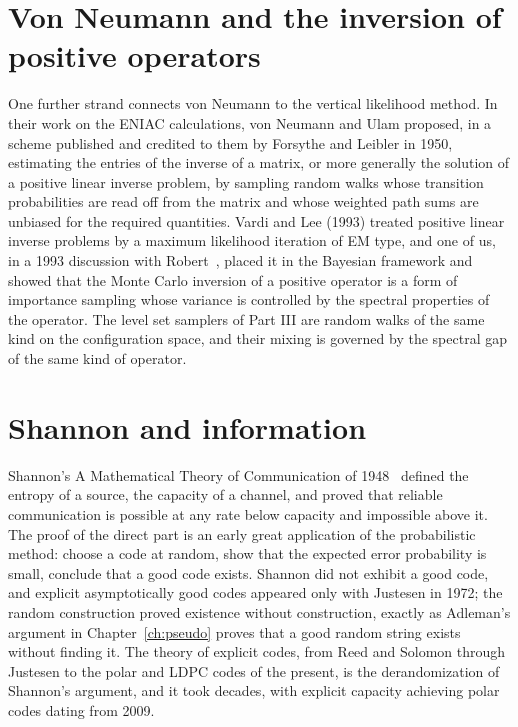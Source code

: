 \section{Von Neumann and the inversion of positive operators}

One further strand connects von Neumann to the vertical likelihood method. In their work on the ENIAC calculations, von Neumann and Ulam proposed, in a scheme published and credited to them by Forsythe and Leibler in 1950, estimating the entries of the inverse of a matrix, or more generally the solution of a positive linear inverse problem, by sampling random walks whose transition probabilities are read off from the matrix and whose weighted path sums are unbiased for the required quantities. Vardi and Lee (1993) treated positive linear inverse problems by a maximum likelihood iteration of EM type, and one of us, in a 1993 discussion with Robert~\cite{PolsonRobert}, placed it in the Bayesian framework and showed that the Monte Carlo inversion of a positive operator is a form of importance sampling whose variance is controlled by the spectral properties of the operator. The level set samplers of Part III are random walks of the same kind on the configuration space, and their mixing is governed by the spectral gap of the same kind of operator.

\section{Shannon and information}

Shannon's A Mathematical Theory of Communication of 1948~\cite{Shannon48} defined the entropy of a source, the capacity of a channel, and proved that reliable communication is possible at any rate below capacity and impossible above it. The proof of the direct part is an early great application of the probabilistic method: choose a code at random, show that the expected error probability is small, conclude that a good code exists. Shannon did not exhibit a good code, and explicit asymptotically good codes appeared only with Justesen in 1972; the random construction proved existence without construction, exactly as Adleman's argument in Chapter~\ref{ch:pseudo} proves that a good random string exists without finding it. The theory of explicit codes, from Reed and Solomon through Justesen to the polar and LDPC codes of the present, is the derandomization of Shannon's argument, and it took decades, with explicit capacity achieving polar codes dating from 2009.

